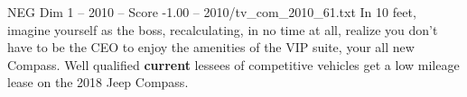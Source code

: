 \begin{textsample}{NEG Dim 1 – 2010 – Score -1.00 – 2010/tv\_com\_2010\_61.txt}  \label{ex:f1_neg_038}
In 10 feet, imagine yourself as the boss, recalculating, in no time at all, realize you don't have to be the CEO to enjoy the amenities of the VIP suite, your all new Compass.
Well qualified \textbf{current} lessees of competitive vehicles get a low mileage lease on the 2018 Jeep Compass.

\end{textsample}
